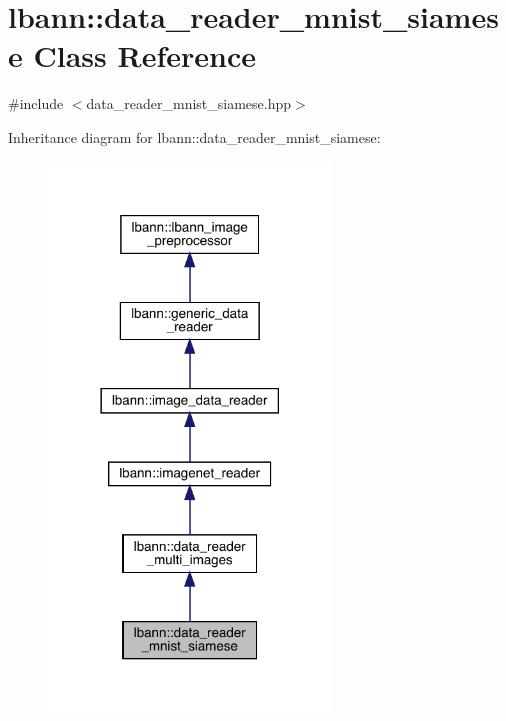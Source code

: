 \hypertarget{classlbann_1_1data__reader__mnist__siamese}{}\section{lbann\+:\+:data\+\_\+reader\+\_\+mnist\+\_\+siamese Class Reference}
\label{classlbann_1_1data__reader__mnist__siamese}


{\ttfamily \#include $<$data\+\_\+reader\+\_\+mnist\+\_\+siamese.\+hpp$>$}



Inheritance diagram for lbann\+:\+:data\+\_\+reader\+\_\+mnist\+\_\+siamese\+:\nopagebreak
\begin{figure}[H]
\begin{center}
\leavevmode
\includegraphics[width=213pt]{classlbann_1_1data__reader__mnist__siamese__inherit__graph}
\end{center}
\end{figure}


